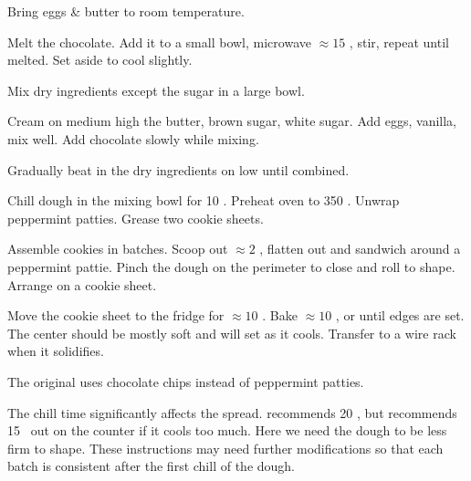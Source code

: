 \begin{preparation}
\item Bring eggs \& butter to room temperature.

\item Melt the chocolate.
	Add it to a small bowl, microwave $\approx 15$ \second, stir, repeat until melted.
	Set aside to cool slightly.

\item Mix dry ingredients except the sugar in a large bowl.

\item Cream on medium high the butter, brown sugar, white sugar.
	Add eggs, vanilla, mix well.
	Add chocolate slowly while mixing.

\item Gradually beat in the dry ingredients on low until combined.

\item Chill dough in the mixing bowl for 10 \minute.
	Preheat oven to 350 \Fahrenheit.
	Unwrap peppermint patties.
	Grease two cookie sheets.

\item Assemble cookies in batches.
	Scoop out $\approx2$ \Tablespoon, flatten out and sandwich around a peppermint pattie.
	Pinch the dough on the perimeter to close and roll to shape.
	Arrange on a cookie sheet.

\item Move the cookie sheet to the fridge for $\approx 10$ \minute.
	Bake $\approx 10$ \minute, or until edges are set.
	The center should be mostly soft and will set as it cools.
	Transfer to a wire rack when it solidifies.
\end{preparation}

\begin{variation}
\item The original uses chocolate chips instead of peppermint patties.
\end{variation}


\begin{experiments}
\item The chill time significantly affects the spread.
	\citeauthor{sallyBrownies2020} \cite{sallyBrownies2020} recommends 20 \minute, but recommends 15 \minute~out on the counter if it cools too much.
	Here we need the dough to be less firm to shape.
	These instructions may need further modifications so that each batch is consistent after the first chill of the dough.
\end{experiments}


\recipeend

